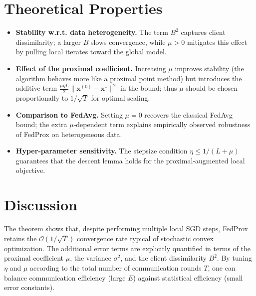 \documentclass{article}
\begin{document}
\section*{Theoretical Properties}
\begin{itemize}
\item \textbf{Stability w.r.t. data heterogeneity.} The term $B^{2}$ captures client dissimilarity; a larger $B$ slows convergence, while $\mu>0$ mitigates this effect by pulling local iterates toward the global model.
\item \textbf{Effect of the proximal coefficient.} Increasing $\mu$ improves stability (the algorithm behaves more like a proximal point method) but introduces the additive term $\frac{\mu\eta L}{2}\|\mathbf{x}^{(0)}-\mathbf{x}^{\star}\|^{2}$ in the bound; thus $\mu$ should be chosen proportionally to $1/\sqrt{T}$ for optimal scaling.
\item \textbf{Comparison to FedAvg.} Setting $\mu=0$ recovers the classical FedAvg bound; the extra $\mu$‑dependent term explains empirically observed robustness of FedProx on heterogeneous data.
\item \textbf{Hyper‑parameter sensitivity.} The stepsize condition $\eta\le 1/(L+\mu)$ guarantees that the descent lemma holds for the proximal‑augmented local objective.
\end{itemize}

\section*{Discussion}
The theorem shows that, despite performing multiple local SGD steps, FedProx retains the $\mathcal{O}(1/\sqrt{T})$ convergence rate typical of stochastic convex optimization. The additional error terms are explicitly quantified in terms of the proximal coefficient $\mu$, the variance $\sigma^{2}$, and the client dissimilarity $B^{2}$. By tuning $\eta$ and $\mu$ according to the total number of communication rounds $T$, one can balance communication efficiency (large $E$) against statistical efficiency (small error constants).

\newpage
\end{document}
